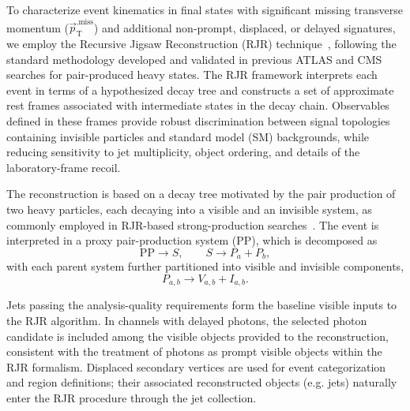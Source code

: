
To characterize event kinematics in final states with significant missing transverse momentum ($\vec{p}_{\mathrm{T}}^{,\text{miss}}$) and additional non-prompt, displaced, or delayed signatures, we employ the Recursive Jigsaw Reconstruction (RJR) technique~\cite{Jackson_2017_RJR,Jackson_2017_SparticlesInMotion}, following the standard methodology developed and validated in previous ATLAS and CMS searches for pair-produced heavy states. The RJR framework interprets each event in terms of a hypothesized decay tree and constructs a set of approximate rest frames associated with intermediate states in the decay chain. Observables defined in these frames provide robust discrimination between signal topologies containing invisible particles and standard model (SM) backgrounds, while reducing sensitivity to jet multiplicity, object ordering, and details of the laboratory-frame recoil.


The reconstruction is based on a decay tree motivated by the pair production of two heavy particles, each decaying into a visible and an invisible system, as commonly employed in RJR-based strong-production searches~\cite{ATLAS_2018_RJR_JetMET_36fb}. The event is interpreted in a proxy pair-production system (PP), which is decomposed as
\begin{equation}
\mathrm{PP} \to S, \qquad S \to P_a + P_b,
\end{equation}
with each parent system further partitioned into visible and invisible components,
\begin{equation}
P_{a,b} \to V_{a,b} + I_{a,b}.
\end{equation}

Jets passing the analysis-quality requirements form the baseline visible inputs to the RJR algorithm. In channels with delayed photons, the selected photon candidate is included among the visible objects provided to the reconstruction, consistent with the treatment of photons as prompt visible objects within the RJR formalism. Displaced secondary vertices are used for event categorization and region definitions; their associated reconstructed objects (e.g. jets) naturally enter the RJR procedure through the jet collection.

